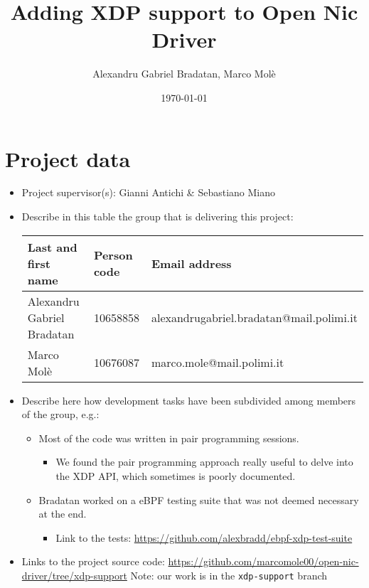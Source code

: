 \documentclass[10pt,a4]{article}
\author{Alexandru Gabriel Bradatan, Marco Molè}
\date{\today}
\title{Adding XDP support to Open Nic Driver}
\begin{document}
\maketitle
\tableofcontents



\section{Project data}

\begin{itemize}
\item Project supervisor(s): Gianni Antichi \& Sebastiano Miano
\item Describe in this table the group that is delivering this project:

\begin{center}
\begin{tabular}{lll}
Last and first name & Person code & Email address\\
\hline
  Alexandru Gabriel Bradatan & 10658858 & alexandrugabriel.bradatan@mail.polimi.it \\
  Marco Molè & 10676087  &     marco.mole@mail.polimi.it
\end{tabular}
\end{center}

\item
Describe here how development tasks have been subdivided among members
of the group, e.g.:

\begin{itemize}
\item Most of the code was written in pair programming sessions.
\begin{itemize}
	\item We found the pair programming approach really useful to delve into the XDP API, which sometimes is poorly documented.
\end{itemize}
\item Bradatan worked on a eBPF testing suite that was not deemed necessary at the end.
\begin{itemize}
  \item Link to the tests: \url{https://github.com/alexbradd/ebpf-xdp-test-suite}
\end{itemize}
\end{itemize}

\item Links to the project source code: \url{https://github.com/marcomole00/open-nic-driver/tree/xdp-support}
Note: our work is in the \texttt{xdp-support} branch

\end{itemize}
\end{document}
